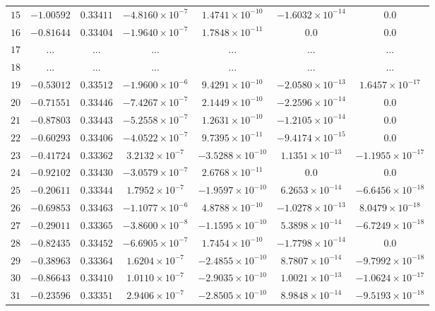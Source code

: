 \begin{landscape}
\begin{center}
\begin{longtable}{lcccccc}
$15$ & $-1.00592$ & $0.33411$ & $-4.8160\times{}10^{-7}$ & $1.4741\times{}10^{-10}$ & $-1.6032\times{}10^{-14}$ & $0.0$ \\
$16$ & $-0.81644$ & $0.33404$ & $-1.9640\times{}10^{-7}$ & $1.7848\times{}10^{-11}$ & $0.0$ & $0.0$ \\
$17$ & ... & ... & ... & ... & ... & ... \\
$18$ & ... & ... & ... & ... & ... & ... \\
$19$ & $-0.53012$ & $0.33512$ & $-1.9600\times{}10^{-6}$ & $9.4291\times{}10^{-10}$ & $-2.0580\times{}10^{-13}$ & $1.6457\times{}10^{-17}$ \\
$20$ & $-0.71551$ & $0.33446$ & $-7.4267\times{}10^{-7}$ & $2.1449\times{}10^{-10}$ & $-2.2596\times{}10^{-14}$ & $0.0$ \\
$21$ & $-0.87803$ & $0.33443$ & $-5.2558\times{}10^{-7}$ & $1.2631\times{}10^{-10}$ & $-1.2105\times{}10^{-14}$ & $0.0$ \\
$22$ & $-0.60293$ & $0.33406$ & $-4.0522\times{}10^{-7}$ & $9.7395\times{}10^{-11}$ & $-9.4174\times{}10^{-15}$ & $0.0$ \\
$23$ & $-0.41724$ & $0.33362$ & $3.2132\times{}10^{-7}$ & $-3.5288\times{}10^{-10}$ & $1.1351\times{}10^{-13}$ & $-1.1955\times{}10^{-17}$ \\
$24$ & $-0.92102$ & $0.33430$ & $-3.0579\times{}10^{-7}$ & $2.6768\times{}10^{-11}$ & $0.0$ & $0.0$ \\
$25$ & $-0.20611$ & $0.33344$ & $1.7952\times{}10^{-7}$ & $-1.9597\times{}10^{-10}$ & $6.2653\times{}10^{-14}$ & $-6.6456\times{}10^{-18}$ \\
$26$ & $-0.69853$ & $0.33463$ & $-1.1077\times{}10^{-6}$ & $4.8788\times{}10^{-10}$ & $-1.0278\times{}10^{-13}$ & $8.0479\times{}10^{-18}$ \\
$27$ & $-0.29011$ & $0.33365$ & $-3.8600\times{}10^{-8}$ & $-1.1595\times{}10^{-10}$ & $5.3898\times{}10^{-14}$ & $-6.7249\times{}10^{-18}$ \\
$28$ & $-0.82435$ & $0.33452$ & $-6.6905\times{}10^{-7}$ & $1.7454\times{}10^{-10}$ & $-1.7798\times{}10^{-14}$ & $0.0$ \\
$29$ & $-0.38963$ & $0.33364$ & $1.6204\times{}10^{-7}$ & $-2.4855\times{}10^{-10}$ & $8.7807\times{}10^{-14}$ & $-9.7992\times{}10^{-18}$ \\
$30$ & $-0.86643$ & $0.33410$ & $1.0110\times{}10^{-7}$ & $-2.9035\times{}10^{-10}$ & $1.0021\times{}10^{-13}$ & $-1.0624\times{}10^{-17}$ \\
$31$ & $-0.23596$ & $0.33351$ & $2.9406\times{}10^{-7}$ & $-2.8505\times{}10^{-10}$ & $8.9848\times{}10^{-14}$ & $-9.5193\times{}10^{-18}$ \\

\end{longtable}
\end{center}
\end{landscape}
